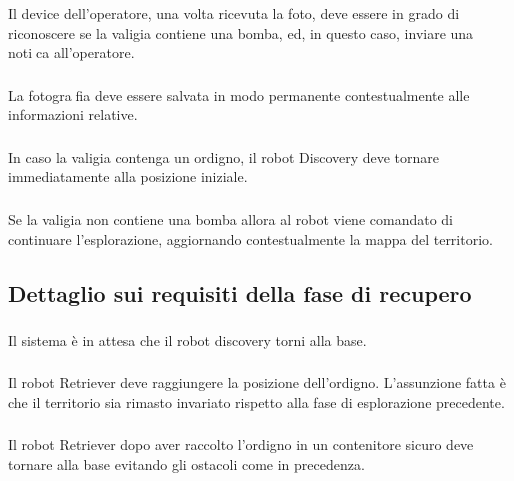 Il device dell'operatore, una volta ricevuta la foto, deve essere in grado di riconoscere se la valigia contiene una bomba, ed, in questo caso, inviare una notica all'operatore.

\subsubsection[R-storePhoto]{}

La fotografia deve essere salvata in modo permanente contestualmente alle informazioni relative.

\subsubsection[R-backHomeSinceBomb]{}

In caso la valigia contenga un ordigno, il robot Discovery deve tornare immediatamente alla posizione iniziale.

\subsubsection[R-continueExploreAfterPhoto]{}

Se la valigia non contiene una bomba allora al robot viene comandato di continuare l'esplorazione, aggiornando contestualmente la mappa del territorio.

\subsection{Dettaglio sui requisiti della fase di recupero}

\subsubsection[R-waitForHome]{}

Il sistema è in attesa che il robot discovery torni alla base.

\subsubsection[R-reachBag]{}

Il robot Retriever deve raggiungere la posizione dell'ordigno.
L'assunzione fatta è che il territorio sia rimasto invariato rispetto alla fase di esplorazione precedente.

\subsubsection[R-bagAtHome]{}

Il robot Retriever dopo aver raccolto l'ordigno in un contenitore sicuro deve tornare alla base evitando gli ostacoli come in precedenza.
